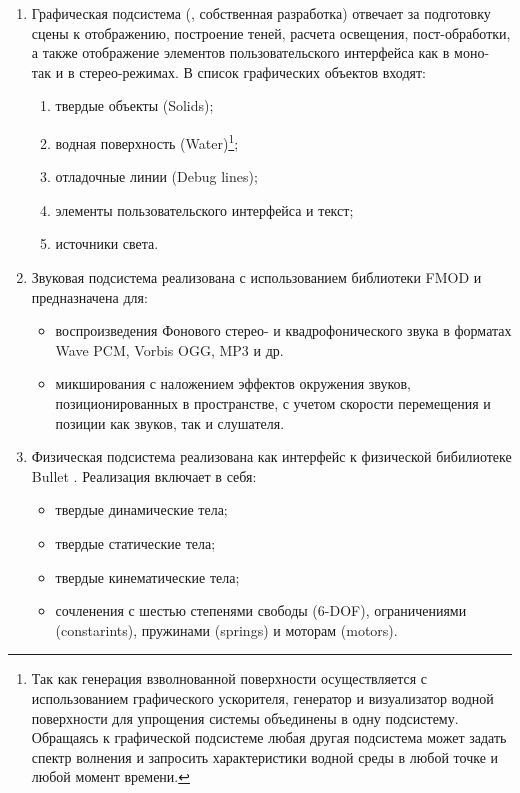 \begin{enumerate}
	\item	Графическая подсистема (, собственная разработка) 
			отвечает за подготовку сцены к отображению, построение теней, 
			расчета освещения, пост-обработки, а также отображение элементов пользовательского 
			интерфейса как в моно- так и в стерео-режимах. В список графических объектов входят:
			\begin{enumerate}
			\item	твердые объекты (Solids);
			\item	водная поверхность (Water)\footnote{Так как генерация взволнованной поверхности 
					осуществляется с использованием графического ускорителя, генератор и визуализатор 
					водной поверхности для упрощения системы объединены в одну подсистему. 
					Обращаясь к графической подсистеме любая другая подсистема может задать 
					спектр волнения и запросить характеристики водной среды в любой точке и любой момент времени.};
			\item	отладочные линии (Debug lines);
			\item	элементы пользовательского интерфейса и текст;
			\item	источники света.
			\end{enumerate}
	\item	Звуковая подсистема реализована с использованием библиотеки FMOD \citep{fmod} и предназначена для:
			\begin{itemize}
				\item	воспроизведения Фонового стерео- и квадрофонического звука в 
						форматах Wave PCM, Vorbis OGG, MP3 и др.
				\item	микширования с наложением эффектов окружения звуков, 
						позиционированных в пространстве, с учетом скорости 
						перемещения и позиции как звуков, так и слушателя.
			\end{itemize}

	\item	Физическая подсистема реализована как интерфейс к физической 
			бибилиотеке Bullet \citep{bullet}. Реализация включает в себя:
			\begin{itemize}
				\item 	твердые динамические тела;
				\item 	твердые статические тела;
				\item 	твердые кинематические тела;
				\item 	сочленения с шестью степенями свободы (6-DOF), 
						ограничениями (constarints), пружинами (springs) и моторам (motors).
			\end{itemize}
	

\end{enumerate}
